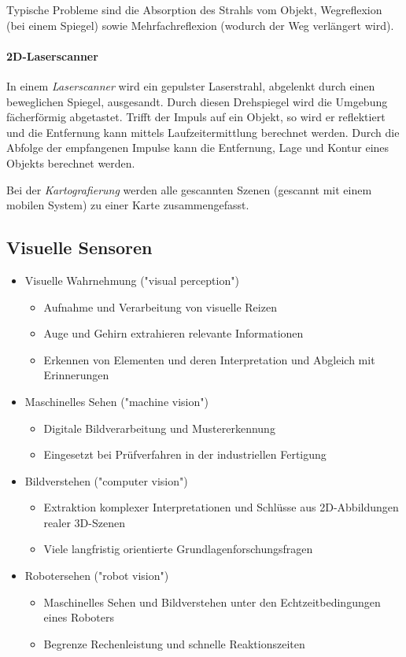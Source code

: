 					Typische Probleme sind die Absorption des Strahls vom Objekt, Wegreflexion (\zB bei einem Spiegel) sowie Mehrfachreflexion (wodurch der Weg verlängert wird).

				\paragraph{2D-Laserscanner}
					In einem \emph{Laserscanner} wird ein gepulster Laserstrahl, abgelenkt durch einen beweglichen Spiegel, ausgesandt. Durch diesen Drehspiegel wird die Umgebung fächerförmig abgetastet. Trifft der Impuls auf ein Objekt, so wird er reflektiert und die Entfernung kann mittels Laufzeitermittlung berechnet werden. Durch die Abfolge der empfangenen Impulse kann die Entfernung, Lage und Kontur eines Objekts berechnet werden.
					
					Bei der \emph{Kartografierung} werden alle gescannten Szenen (gescannt mit einem mobilen System) zu einer Karte zusammengefasst.

		\subsection{Visuelle Sensoren}
			\begin{itemize}
				\item Visuelle Wahrnehmung ("visual perception")
					\begin{itemize}
						\item Aufnahme und Verarbeitung von visuelle Reizen
						\item Auge und Gehirn extrahieren relevante Informationen
						\item Erkennen von Elementen und deren Interpretation und Abgleich mit Erinnerungen
					\end{itemize}
				\item Maschinelles Sehen ("machine vision")
					\begin{itemize}
						\item Digitale Bildverarbeitung und Mustererkennung
						\item Eingesetzt \zB bei Prüfverfahren in der industriellen Fertigung
					\end{itemize}
				\item Bildverstehen ("computer vision")
					\begin{itemize}
						\item Extraktion komplexer Interpretationen und Schlüsse aus 2D-Abbildungen realer 3D-Szenen
						\item Viele langfristig orientierte Grundlagenforschungsfragen
					\end{itemize}
				\item Robotersehen ("robot vision")
					\begin{itemize}
						\item Maschinelles Sehen und Bildverstehen unter den Echtzeitbedingungen eines Roboters
						\item Begrenze Rechenleistung und schnelle Reaktionszeiten
					\end{itemize}
			\end{itemize}
		
